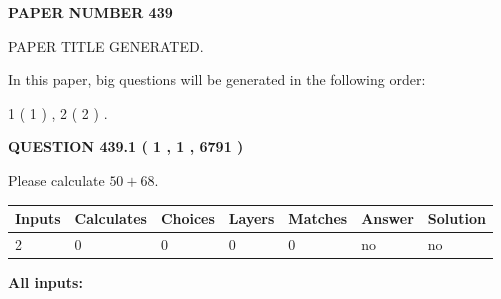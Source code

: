 \documentclass[12pt]{article}
\begin{document}
   
   
   
\newpage 
\setcounter{page}{ 
   439001 } 
   
   
   
   
 {\textbf{ \Large{ PAPER NUMBER  439  }}}
   
   
\vspace{0.2in}
   
   
   
   
   
   
   
   
 \vspace{0.2in}
 
 
 
 
   
   
 PAPER TITLE GENERATED.
   
   
   
\vspace{0.2in}
   
In this paper, big questions will be generated in the following order: 
   
   
   1 ( 1 )
 ,
   2 ( 2 )
 .
  
\vspace{0.2in}
  
{\textbf{\Large{QUESTION
439.1 
 ( 1 , 1 , 6791 )
}}}
  
  
 
Please calculate $ %
50 +  %
68 $.
 
 
   
   
   
   
\noindent\begin{tabular}{|l|l|l|l|l|l|l|}
 \hline
Inputs & Calculates & Choices & Layers & Matches & Answer & Solution \\ \hline
 2  & 
 0  & 
 0
  & 
 0  & 
 0  & 
  no & 
  no 
  \\ \hline
 \end{tabular}
   
   
   
   
\noindent{}
   
   
   
   
\noindent\vspace{0.1in}\hspace{-0.08in} {\textbf{\Large{All inputs: }}}
   
   
  
\end{document}

